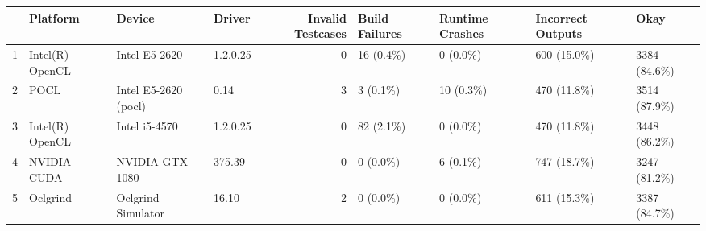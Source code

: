 \begin{tabular}{llllrllll}
\toprule
{} &         Platform &                Device &    Driver &  Invalid Testcases & Build Failures & Runtime Crashes & Incorrect Outputs &           Okay \\
\midrule
1 &  Intel(R) OpenCL &         Intel E5-2620 &  1.2.0.25 &                  0 &     16  (0.4\%) &       0  (0.0\%) &      600  (15.0\%) &  3384  (84.6\%) \\
2 &             POCL &  Intel E5-2620 (pocl) &      0.14 &                  3 &      3  (0.1\%) &      10  (0.3\%) &      470  (11.8\%) &  3514  (87.9\%) \\
3 &  Intel(R) OpenCL &         Intel i5-4570 &  1.2.0.25 &                  0 &     82  (2.1\%) &       0  (0.0\%) &      470  (11.8\%) &  3448  (86.2\%) \\
4 &      NVIDIA CUDA &       NVIDIA GTX 1080 &    375.39 &                  0 &      0  (0.0\%) &       6  (0.1\%) &      747  (18.7\%) &  3247  (81.2\%) \\
5 &         Oclgrind &    Oclgrind Simulator &     16.10 &                  2 &      0  (0.0\%) &       0  (0.0\%) &      611  (15.3\%) &  3387  (84.7\%) \\
\bottomrule
\end{tabular}
